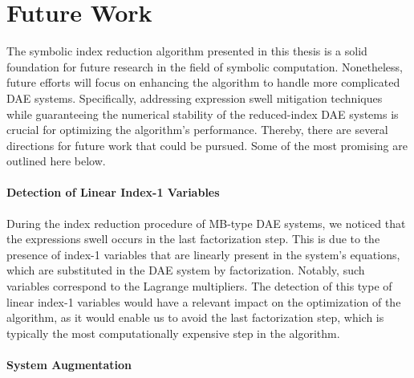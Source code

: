 \section{Future Work}
\label{chap6:sec:future_work}

The symbolic index reduction algorithm presented in this thesis is a solid foundation for future research in the field of symbolic computation. Nonetheless, future efforts will focus on enhancing the algorithm to handle more complicated \ac{DAE} systems. Specifically, addressing expression swell mitigation techniques while guaranteeing the numerical stability of the reduced-index \ac{DAE} systems is crucial for optimizing the algorithm's performance. Thereby, there are several directions for future work that could be pursued. Some of the most promising are outlined here below.

\paragraph{Detection of Linear Index-1 Variables}

During the index reduction procedure of \ac{MB}-type \ac{DAE} systems, we noticed that the expressions swell occurs in the last factorization step. This is due to the presence of index-1 variables that are linearly present in the system's equations, which are substituted in the \ac{DAE} system by factorization. Notably, such variables correspond to the Lagrange multipliers. The detection of this type of linear index-1 variables would have a relevant impact on the optimization of the algorithm, as it would enable us to avoid the last factorization step, which is typically the most computationally expensive step in the algorithm.

\paragraph{System Augmentation}

